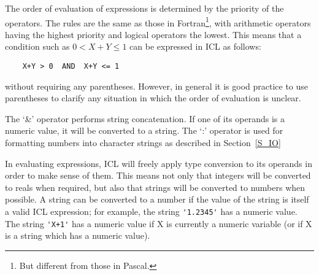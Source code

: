 \begin{description}
The order of evaluation of expressions is determined by the priority of the
operators.
The rules are the same as those in Fortran\footnote{But different from those
in Pascal.}, with arithmetic operators having the highest priority and logical
operators the lowest.
This means that a condition such as \( 0 < X+Y \leq 1 \) can be expressed in
ICL as follows:

\begin{small}
\begin{verbatim}
    X+Y > 0  AND  X+Y <= 1
\end{verbatim}
\end{small}

without requiring any parentheses.
However, in general it is good practice to use parentheses to clarify any
situation in which the order of evaluation is unclear.

The `\&' operator performs string concatenation.
If one of its operands is a numeric value, it will be converted to a string.
The `:' operator is used for formatting numbers into character strings as
described in Section~\ref{S_IO}
\end{description}
In evaluating expressions, ICL will freely apply type conversion to its operands
in order to make sense of them.
This means not only that integers will be converted to reals when required, but
also that strings will be converted to numbers when possible.
A string can be converted to a number if the value of the string is itself a
valid ICL expression; for example, the string \verb+'1.2345'+ has a numeric
value.
The string \verb-'X+1'- has a numeric value if X is currently a numeric
variable (or if X is a string which has a numeric value).

